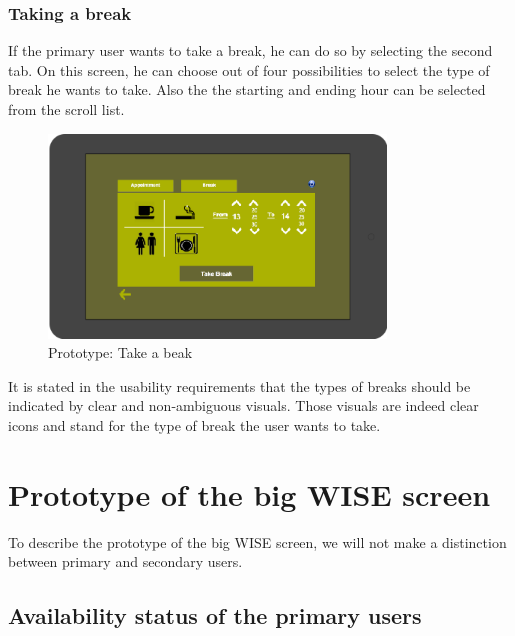 \documentclass[11pt, a4paper,svglistings]{report}
\begin{document}

\subsubsection{Taking a break}

If the primary user wants to take a break, he can do so by selecting the second tab. On this screen, he can choose out of four possibilities to select the type of break he wants to take. Also the the starting and ending hour can be selected from the scroll list.

\begin{figure}[H]
\centering
    \includegraphics[width=0.8\textwidth]{Prototypes/TakeBreak.png}
  \caption{Prototype: Take a beak}
\end{figure}

It is stated in the usability requirements that the types of breaks should be indicated by clear and non-ambiguous visuals. Those visuals are indeed clear icons and stand for the type of break the user wants to take.


\newpage

\section{Prototype of the big WISE screen}

To describe the prototype of the big WISE screen, we will not make a distinction between primary and secondary users.

\subsection{Availability status of the primary users}
\end{document}
